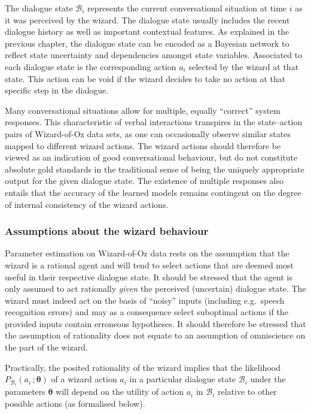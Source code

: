 The dialogue state $\mathcal{B}_i$ represents the current conversational situation at time $i$ as it was perceived by the wizard.  The dialogue state usually includes the recent dialogue history as well as important contextual features.  As explained in the previous chapter, the dialogue state can be encoded as a Bayesian network to reflect state uncertainty and dependencies amongst state variables. Associated to each dialogue state is the corresponding action $a_i$ selected by the wizard at that state. This action can be void if the wizard decides to take no action at that specific step in the dialogue. 


Many conversational situations allow for multiple, equally ``correct'' system responses.  This characteristic of verbal interactions transpires in the state--action pairs of Wizard-of-Oz data sets, as one can occasionally observe similar states mapped to different wizard actions. The wizard actions should therefore be viewed as an indication of good conversational behaviour, but do not constitute absolute gold standards in the traditional sense of being the uniquely appropriate output for the given dialogue state. The existence of multiple responses also entails that the accuracy of the learned models remains contingent on the degree of internal consistency of the wizard actions. 

\subsubsection*{Assumptions about the wizard behaviour}

Parameter estimation on Wizard-of-Oz data rests on the assumption that the wizard is a rational agent and will tend to select actions that are deemed most useful in their respective dialogue state. It should be stressed that the agent is only assumed to act rationally \textit{given} the perceived (uncertain) dialogue state. The wizard must indeed act on the basis of ``noisy'' inputs (including e.g.\ speech recognition errors) and may as a consequence select suboptimal actions if the provided inputs contain erroneous hypotheses. It should therefore be stressed that the assumption of rationality does not equate to an assumption of omniscience on the part of the wizard.  

Practically, the posited rationality of the wizard implies that the likelihood $P_{\mathcal{B}_i}(a_i\,; \boldsymbol\theta)$ of a wizard action $a_i$ in a particular dialogue state $\mathcal{B}_i$ under the parameters $\boldsymbol\theta$ will depend on the utility of action $a_i$ in $\mathcal{B}_i$ relative to other possible actions (as formalised below).

